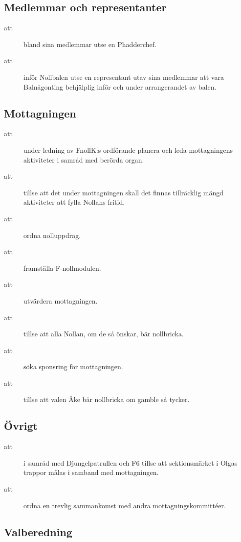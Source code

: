 \documentclass[a4paper]{article}
\begin{document}
\begin{foreningenv}{\forening{}}
    \subsection{Medlemmar och representanter}
    \begin{description}
        \item[att] bland sina medlemmar utse en Phadderchef.
        \item[att] inför Nollbalen utse en representant utav sina medlemmar att vara Balnågonting behjälplig inför och under arrangerandet av balen.
    \end{description}
    
    \subsection{Mottagningen}
    \begin{description}
        \item[att] under ledning av FnollK:s ordförande planera och leda mottagningens aktiviteter i samråd med berörda organ.
        \item[att] tillse att det under mottagningen skall det finnas tillräcklig mängd aktiviteter att fylla Nollans fritid.
        \item[att] ordna nolluppdrag.
        \item[att] framställa F-nollmodulen.
        \item[att] utvärdera mottagningen.
        \item[att] tillse att alla Nollan, om de så önskar, bär nollbricka.
        \item[att] söka sponsring för mottagningen.
        \item[att] tillse att valen Åke bär nollbricka om gamble så tycker.
    \end{description}
    
    \subsection{Övrigt}
    \begin{description}
        \item[att] i samråd med Djungelpatrullen och F6 tillse att sektionsmärket i Olgas trappor målas i samband med mottagningen.
        \item[att] ordna en trevlig sammankomst med andra mottagningskommittéer.
    \end{description}
    
    \subsection{Valberedning}
    \aliggvalber{}
    

\end{foreningenv}
\end{document}
